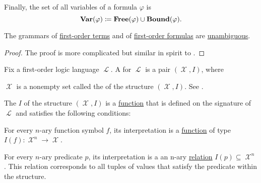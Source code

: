 \begin{definition}
\begin{thmenum}
     Finally, the set of all variables of a formula \( \varphi \) is
    \begin{equation}\label{eq:def:first_order_syntax/formula_variables}
      \operatorname{\mathbf{Var}}(\varphi) \coloneqq \operatorname{\mathbf{Free}}(\varphi) \cup \operatorname{\mathbf{Bound}}(\varphi).
    \end{equation}
  \end{thmenum}
\end{definition}

\begin{proposition}\label{thm:first_order_terms_and_formulas_are_unambiguous}
  The grammars of \hyperref[def:first_order_syntax/term]{first-order terms} and of \hyperref[def:first_order_syntax/formula]{first-order formulas} are \hyperref[def:grammar_derivation/ambiguity]{unambiguous}.
\end{proposition}
\begin{proof}
  The proof is more complicated but similar in spirit to .
\end{proof}

\begin{definition}\label{def:first_order_structure}
  Fix a first-order logic language \( \mscrL \). A  for \( \mscrL \) is a pair \( (\mscrX, I) \), where

  \begin{thmenum}
     \( \mscrX \) is a nonempty set called the  of the structure \( (\mscrX, I) \). See .

     The  \( I \) of the structure \( (\mscrX, I) \) is a \hyperref[def:function/single_valued]{function} that is defined on the signature of \( \mscrL \) and satisfies the following conditions:
    \begin{thmenum}
       For every \( n \)-ary function symbol \( f \), its interpretation is a \hyperref[def:function]{function} of type \( I(f): \mscrX^n \to \mscrX \).

       For every \( n \)-ary predicate \( p \), its interpretation is a an n-ary \hyperref[def:relation]{relation} \( I(p) \subseteq \mscrX^n \). This relation corresponds to all tuples of values that satisfy the predicate within the structure.
    \end{thmenum}
  \end{thmenum}
\end{definition}

